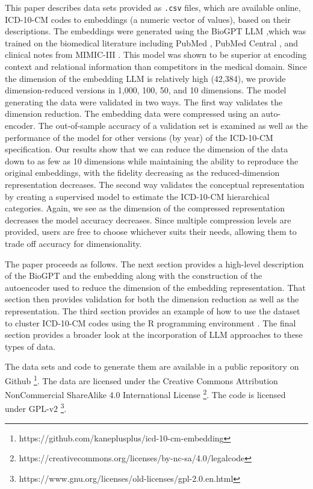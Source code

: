 \documentclass{bmcart}
\begin{document}
This paper describes data sets provided as \texttt{.csv} files, which are 
available online, ICD-10-CM codes 
to embeddings (a numeric vector of values), based on their descriptions. The 
embeddings were generated using the BioGPT LLM \cite{luo2022},which was trained on the biomedical literature including PubMed \cite{pubmed}, 
PubMed Central \cite{pubmedcentral}, and clinical notes from MIMIC-III 
\cite{mimiciii}. This model was shown to be superior at 
encoding context and relational information than competitors 
in the medical domain. Since the dimension of the embedding LLM is relatively
high (42,384), we provide dimension-reduced versions in 1,000, 100, 50, 
and 10 dimensions. The model generating the data were validated in two ways. 
The first way validates the dimension reduction. The embedding data were 
compressed using an auto-encoder. The out-of-sample accuracy of a validation 
set is examined as well as the performance of the model for other versions 
(by year) of the ICD-10-CM specification. Our results show that we can reduce 
the dimension of the data down to as few as 10 dimensions while maintaining 
the ability to reproduce the original embeddings, with the fidelity decreasing 
as the reduced-dimension representation decreases. The second way validates 
the conceptual representation by creating a supervised model to estimate the 
ICD-10-CM hierarchical categories. Again, we see as the dimension of the 
compressed representation decreases the model accuracy decreases. Since 
multiple compression levels are provided, users are free to choose whichever 
suits their needs, allowing them to trade off accuracy for dimensionality.

The paper proceeds as follows. The next section provides a high-level 
description of the BioGPT and the embedding along with the construction of 
the autoencoder used to reduce the dimension of the embedding representation. 
That section then provides validation for both the dimension reduction as well 
as the representation. The third section provides an example of how to use the 
dataset to cluster ICD-10-CM codes using the R programming environment 
\cite{rcore}. The final section provides a broader look at the
incorporation of LLM approaches to these types of data.

The data sets and code to generate them are available in a public
repository on Github 
\footnote{https://github.com/kaneplusplus/icd-10-cm-embedding}. 
The data are licensed under the Creative Commons Attribution NonCommercial 
ShareAlike 4.0 International License 
\footnote{https://creativecommons.org/licenses/by-nc-sa/4.0/legalcode}. 
The code is licensed under GPL-v2
\footnote{https://www.gnu.org/licenses/old-licenses/gpl-2.0.en.html}.
\end{document}
